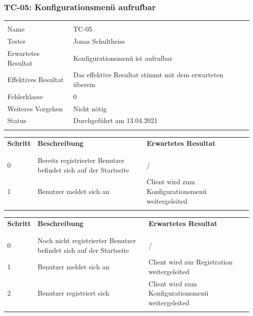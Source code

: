 \subsubsection{TC-05: Konfigurationsmenü aufrufbar}\label{tc-05}
\begin{table}[H]
  \begin{tabularx}{\textwidth}{l X}\hline \\
  Name & TC-05 \\
  Tester & Jonas Schultheiss \\
  Erwartetes Resultat & Konfigurationsmenü ist aufrufbar \\
  Effektives Resultat & Das effektive Resultat stimmt mit dem erwarteten überein \\
  Fehlerklasse & 0 \\
  Weiteres Vorgehen & Nicht nötig \\
  Status & Durchgeführt am 13.04.2021 \\
  \\\hline
  \end{tabularx}
\end{table}
\begin{table}[H]
  \begin{tabularx}{\textwidth}{l X X}
  \textbf{Schritt} & \textbf{Beschreibung} & \textbf{Erwartetes Resultat}\\ \\\hline \\
  0 & Bereits registrierter Benutzer befindet sich auf der Startseite  & / \\
  1 & Benutzer meldet sich an & Client wird zum Konfigurationsmenü weitergeleited \\
  \\\hline
  \end{tabularx}
\end{table}
\begin{table}[H]
  \begin{tabularx}{\textwidth}{l X X}
  \textbf{Schritt} & \textbf{Beschreibung} & \textbf{Erwartetes Resultat}\\ \\\hline \\
  0 & Noch nicht registrierter Benutzer befindet sich auf der Startseite  & / \\
  1 & Benutzer meldet sich an & Client wird zur Registration weitergeleited \\
  2 & Benutzer registriert sich & Client wird zum Konfigurationsmenü weitergeleited \\
  \\\hline
  \end{tabularx}
\end{table}
\pagebreak
